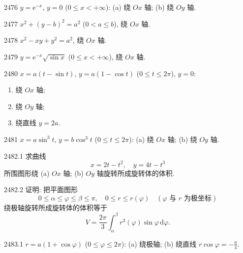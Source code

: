 \begin{prob}[M]{2476}
$y = \mathrm{e}^{-x}$, $y = 0$ ($0 \leqslant x < +\infty$): (a) 绕 $Ox$ 轴; \qquad (b) 绕 $Oy$ 轴.
\end{prob}

\begin{prob}[S]{2477}
$x^2 + (y - b)^2 = a^2$ ($0 < a \leqslant b$), 绕 $Ox$ 轴.
\end{prob}

\begin{prob}[S]{2478}
$x^2 - xy + y^2 = a^2$, 绕 $Ox$ 轴.
\end{prob}

\begin{prob}[S]{2479}
$y = \mathrm{e}^{-x}\sqrt{\sin x}$ ($0 \leqslant x < +\infty$), 绕 $Ox$ 轴.
\end{prob}

\begin{prob}[L]{2480}
$x = a(t - \sin t)$, $y = a(1 - \cos t)$ ($0 \leqslant t \leqslant 2\pi$), $y = 0$:
\begin{enumerate}[label=(\alph*), itemsep=2pt, topsep=3pt]
\item 绕 $Ox$ 轴;
\item 绕 $Oy$ 轴;
\item 绕直线 $y = 2a$.
\end{enumerate}
\end{prob}

\begin{prob}[M]{2481}
$x = a\sin^3 t$, $y = b\cos^3 t$ ($0 \leqslant t \leqslant 2\pi$): (a) 绕 $Ox$ 轴; \qquad (b) 绕 $Oy$ 轴.
\end{prob}

\begin{prob}[M]{2482.1}
求曲线
\[
x = 2t - t^2, \quad y = 4t - t^3
\]
所围图形绕 (a) $Ox$ 轴; (b) $Oy$ 轴旋转所成旋转体的体积.
\end{prob}

\begin{prob}[M]{2482.2}
证明: 把平面图形
\[
0 \leqslant \alpha \leqslant \varphi \leqslant \beta \leqslant \pi, \quad 0 \leqslant r \leqslant r(\varphi) \quad (\varphi\text{ 与 }r\text{ 为极坐标})
\]
绕极轴旋转所成旋转体的体积等于
\[
V = \frac{2\pi}{3}\int_\alpha^\beta r^3(\varphi)\sin\varphi\,\mathrm{d}\varphi.
\]
\end{prob}


\begin{prob}[M]{2483.1}
$r = a(1 + \cos\varphi)$ ($0 \leqslant \varphi \leqslant 2\pi$): (a) 绕极轴; \qquad (b) 绕直线 $r\cos\varphi = -\frac{a}{4}$.
\end{prob}

